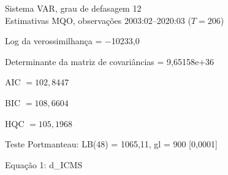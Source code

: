 \documentclass[11pt]{article}
\begin{document}
\thispagestyle{empty}

\begin{center}
Sistema VAR, grau de defasagem 12\\
Estimativas MQO, observações 2003:02--2020:03 ($T=206$)
\end{center}
\noindent
Log da verossimilhança = $-$10233,0\par
\noindent
Determinante da matriz de covariâncias = 9,65158\textrm{e+36}\par
\noindent
AIC $= 102,8447$ \par
\noindent
BIC $= 108,6604$ \par
\noindent
HQC $= 105,1968$ \par
\noindent
Teste Portmanteau: LB(48) = 1065,11, gl = 900 [0,0001]\par
\begin{center}

Equação 1: d\_ICMS\\

\vspace{1em}


\end{center}
\end{document}
